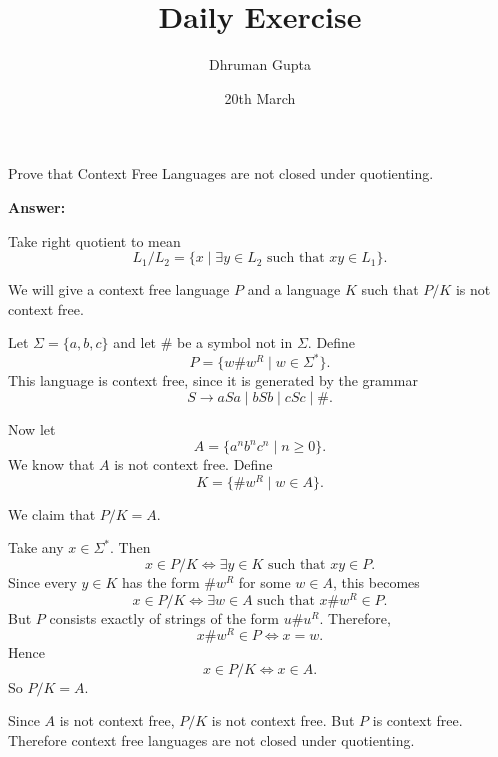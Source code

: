 \documentclass[11pt]{article}
\title{Daily Exercise}
\author{Dhruman Gupta}
\date{20th March}
\begin{document}

Prove that Context Free Languages are not closed under quotienting.

\textbf{Answer:}

Take right quotient to mean
\[
L_1 / L_2 = \{x \mid \exists y \in L_2 \text{ such that } xy \in L_1\}.
\]

We will give a context free language $P$ and a language $K$ such that $P/K$ is not context free.

Let $\Sigma = \{a,b,c\}$ and let $\#$ be a symbol not in $\Sigma$. Define
\[
P = \{w\#w^R \mid w \in \Sigma^*\}.
\]
This language is context free, since it is generated by the grammar
\[
S \to aSa \mid bSb \mid cSc \mid \#.
\]

Now let
\[
A = \{a^n b^n c^n \mid n \geq 0\}.
\]
We know that $A$ is not context free. Define
\[
K = \{\#w^R \mid w \in A\}.
\]

We claim that $P/K = A$.

Take any $x \in \Sigma^*$. Then
\[
x \in P/K \iff \exists y \in K \text{ such that } xy \in P.
\]
Since every $y \in K$ has the form $\#w^R$ for some $w \in A$, this becomes
\[
x \in P/K \iff \exists w \in A \text{ such that } x\#w^R \in P.
\]
But $P$ consists exactly of strings of the form $u\#u^R$. Therefore,
\[
x\#w^R \in P \iff x = w.
\]
Hence
\[
x \in P/K \iff x \in A.
\]
So $P/K = A$.

Since $A$ is not context free, $P/K$ is not context free. But $P$ is context free. Therefore context free languages are not closed under quotienting.
\end{document}
